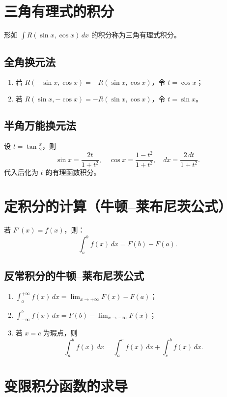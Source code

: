 \section{三角有理式的积分}

形如 $\displaystyle \int R(\sin x, \cos x)\,dx$ 的积分称为三角有理式积分。

\subsection{全角换元法}
\begin{enumerate}
    \item 若 $R(-\sin x, \cos x) = -R(\sin x, \cos x)$，令 $t = \cos x$；
    \item 若 $R(\sin x, -\cos x) = -R(\sin x, \cos x)$，令 $t = \sin x$。
\end{enumerate}

\subsection{半角万能换元法}
设 $t=\tan\frac{x}{2}$，则
\[
    \sin x = \frac{2t}{1+t^2}, \quad \cos x = \frac{1-t^2}{1+t^2}, \quad dx = \frac{2\,dt}{1+t^2}.
\]
代入后化为 $t$ 的有理函数积分。

\section{定积分的计算（牛顿–莱布尼茨公式）}

若 $F'(x)=f(x)$，则：
\[
    \int_a^b f(x)\,dx = F(b)-F(a).
\]

\subsection{反常积分的牛顿–莱布尼茨公式}
\begin{enumerate}
    \item $\displaystyle \int_a^{+\infty} f(x)\,dx = \lim_{x\to+\infty}F(x)-F(a)$；
    \item $\displaystyle \int_{-\infty}^b f(x)\,dx = F(b)-\lim_{x\to-\infty}F(x)$；
    \item 若 $x=c$ 为瑕点，则
          \[
              \int_a^b f(x)\,dx = \int_a^c f(x)\,dx + \int_c^b f(x)\,dx.
          \]
\end{enumerate}

\section{变限积分函数的求导}

